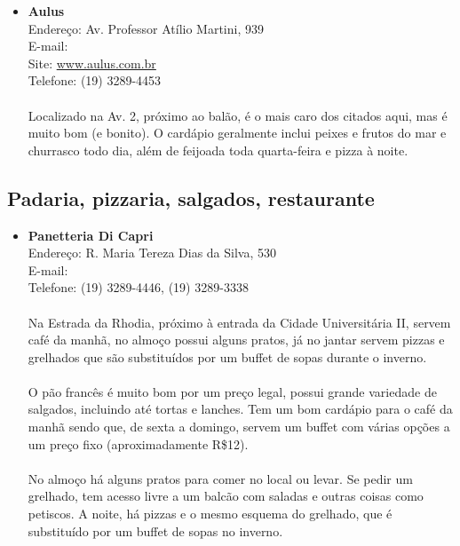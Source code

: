 \begin{itemize}
\item \textbf{Aulus}
  \\Endereço: Av. Professor Atílio Martini, 939
  \\E-mail: 
  \\Site: \url{www.aulus.com.br}
  \\Telefone: (19) 3289-4453
  \\
  \\Localizado na Av. 2, próximo ao balão, é o mais caro dos citados aqui, mas
  é muito bom (e bonito). O cardápio geralmente inclui peixes e frutos do mar e
  churrasco todo dia, além de feijoada toda quarta-feira e pizza à noite.
\end{itemize}

\subsection{Padaria, pizzaria, salgados, restaurante}

\begin{itemize}
\item \textbf{Panetteria Di Capri}
  \\Endereço: R. Maria Tereza Dias da Silva, 530
  \\E-mail: 
  \\Telefone: (19) 3289-4446, (19) 3289-3338
  \\
  \\Na Estrada da Rhodia, próximo à entrada da Cidade Universitária II, servem
  café da manhã, no almoço possui alguns pratos, já no jantar servem pizzas e
  grelhados que são substituídos por um buffet de sopas durante o inverno.
  \\
  \\O pão francês é muito bom por um preço legal, possui grande variedade de
  salgados, incluindo até tortas e lanches. Tem um bom cardápio para o café da
  manhã sendo que, de sexta a domingo, servem um buffet com várias opções a um
  preço fixo (aproximadamente R\$12).
  \\
  \\No almoço há alguns pratos para comer no local ou levar. Se pedir um
  grelhado, tem acesso livre a um balcão com saladas e outras coisas como
  petiscos. A noite, há pizzas e o mesmo esquema do grelhado, que é substituído
  por um buffet de sopas no inverno.
\end{itemize}

